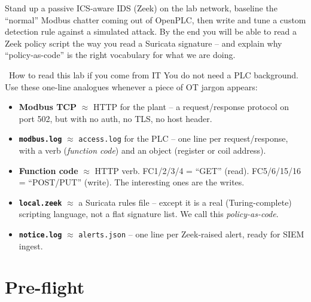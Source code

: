 \documentclass[11pt,a4paper]{article}
\begin{document}
\labheader

\begin{goalbox}
Stand up a passive ICS-aware IDS (Zeek) on the lab network, baseline the ``normal'' Modbus chatter coming out of OpenPLC, then write and tune a custom detection rule against a simulated attack. By the end you will be able to read a Zeek policy script the way you read a Suricata signature -- and explain why ``policy-as-code'' is the right vocabulary for what we are doing.
\end{goalbox}

\begin{notebox}{\faInfoCircle\ How to read this lab if you come from IT}
You do not need a PLC background. Use these one-line analogues whenever a piece of OT jargon appears:
\begin{itemize}\setlength{\itemsep}{1pt}
  \item \textbf{Modbus TCP} $\approx$ HTTP for the plant -- a request/response protocol on port 502, but with no auth, no TLS, no host header.
  \item \textbf{\texttt{modbus.log}} $\approx$ \texttt{access.log} for the PLC -- one line per request/response, with a verb (\emph{function code}) and an object (register or coil address).
  \item \textbf{Function code} $\approx$ HTTP verb. FC1/2/3/4 = ``GET'' (read). FC5/6/15/16 = ``POST/PUT'' (write). The interesting ones are the writes.
  \item \textbf{\texttt{local.zeek}} $\approx$ a Suricata rules file -- except it is a real (Turing-complete) scripting language, not a flat signature list. We call this \emph{policy-as-code}.
  \item \textbf{\texttt{notice.log}} $\approx$ \texttt{alerts.json} -- one line per Zeek-raised alert, ready for SIEM ingest.
\end{itemize}
\end{notebox}

\section*{Pre-flight}
\end{document}
